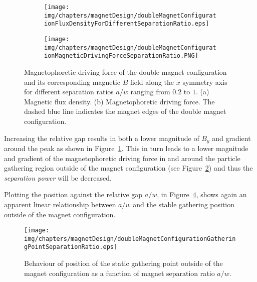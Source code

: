 \begin{figure}[!htb]
\centering
	\begin{subfigure}[b]{0.48\textwidth}
		\texttt{[image: img/chapters/magnetDesign/doubleMagnetConfigurationFluxDensityForDifferentSeparationRatio.eps]}
	\caption{}
    \label{fig:doubleMagnetConfigurationMagneticFluxDensitySeparationRatio}
    \end{subfigure}
    \hfill
	\begin{subfigure}[b]{0.48\textwidth}
		\texttt{[image: img/chapters/magnetDesign/doubleMagnetConfigurationMagneticDrivingForceSeparationRatio.PNG]}
	\caption{}
	\label{fig:doubleMagnetConfigurationMagneticDrivingFroceSeparationRatio} %
	\end{subfigure}
\caption[Magnetic $B$ field of the double magnet configuration and its magnetophoretic driving force along the $x$ symmetry axis for different separation ratio]{Magnetophoretic driving force of the double magnet configuration and its corresponding magnetic $B$ field along the $x$ symmetry axis for different separation ratios $a/w$ ranging from $0.2$ to $1$. (a) Magnetic flux density. (b) Magnetophoretic driving force. The dashed blue line indicates the magnet edges of the double magnet configuration.}%
\label{fig:doubleMagnetConfigurationMagneticDrivingForceAndFluxDensityForDifferentSeparationRatio}
\end{figure}

Increasing the relative gap results in both a lower magnitude of $B_{y}$ and gradient around the peak as shown in Figure~\ref{fig:doubleMagnetConfigurationMagneticFluxDensitySeparationRatio}. This in turn leads to a lower magnitude and gradient of the magnetophoretic driving force in and around the particle gathering region outside of the magnet configuration (see Figure~\ref{fig:doubleMagnetConfigurationMagneticDrivingFroceSeparationRatio}) and thus the \textit{separation power} will be decreased.

Plotting the position against the relative gap $a/w$, in Figure~\ref{fig:stableGatheringPointSeparationRatio}, shows again an apparent linear relationship between $a/w$ and the stable gathering position outside of the magnet configuration.

\begin{figure}[!htb]%
\centering
	\texttt{[image: img/chapters/magnetDesign/doubleMagnetConfigurationGatheringPointSeparationRatio.eps]}
\caption[Behaviour of position of the static gathering point as a function of the magnet separation ratio]{Behaviour of position of the static gathering point outside of the magnet configuration as a function of magnet separation ratio $a/w$.}
\label{fig:stableGatheringPointSeparationRatio}
\end{figure}

